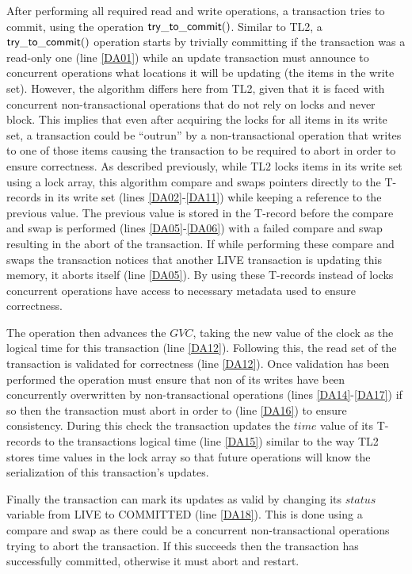 After  performing all  required read  and write  operations,  a transaction
tries to commit, using the operation  ${\sf try\_to\_commit()}$.
Similar to TL2, a ${\sf try\_to\_commit()}$ operation 
starts by trivially committing if the transaction was a read-only one 
(line \ref{DA01}) while
an update transaction must announce to concurrent operations what locations it will be updating
(the items in the write set).
However, the algorithm  differs 
here from TL2, given that 
it is faced with concurrent non-transactional operations
that do not rely on locks and never block. 
This implies 
that even after acquiring the locks for all items in its write set, 
a transaction could be {}``outrun'' by 
a non-transactional operation that writes to one of those items
causing the transaction to be required to abort in order to ensure correctness. 
As described previously, while TL2 locks items in its write set using a
lock array, this algorithm compare and swaps pointers directly to the T-records
in its write set (lines \ref{DA02}-\ref{DA11}) while keeping a reference to the previous value.
The previous value is stored in the T-record before the compare and swap is performed (lines \ref{DA05}-\ref{DA06})
with a failed compare and swap resulting in the abort of the transaction.
If while performing these compare and swaps the transaction notices
that another LIVE transaction is updating this memory, it aborts itself
(line \ref{DA05}).
By using these T-records instead of locks concurrent operations have access to necessary metadata
used to ensure correctness.

The operation then advances the $\mathit{GVC}$, taking the
new value of the clock as the logical time for this transaction (line \ref{DA12}).
Following this, the read set of the transaction is validated for
correctness  (line \ref{DA12}). %
Once validation has been performed the operation must
ensure that non of its writes have been concurrently
overwritten by non-transactional operations (lines \ref{DA14}-\ref{DA17})
if so then the transaction must abort in order to (line \ref{DA16}) to ensure consistency.
During this check the transaction updates the $\mathit{time}$
value of its T-records to the transactions logical time (line \ref{DA15})
similar to the way TL2 stores time values in the lock array
so that future operations will know the serialization of this transaction's updates.

Finally the
transaction can mark its updates as valid by 
changing its 
$\mathit{status}$ variable from LIVE to COMMITTED (line \ref{DA18}).
This is done using a compare and swap as there could be
a concurrent non-transactional operations trying to abort the transaction.  
If this succeeds then the transaction has successfully committed, otherwise
it must abort and restart.


